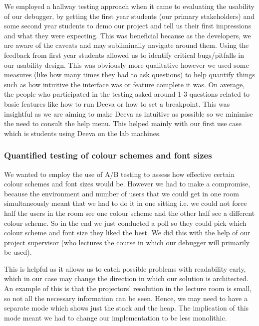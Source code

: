 \documentclass[11pt, a4paper]{article}
\begin{document}
We employed a hallway testing approach when it came to evaluating the usability of our debugger, by getting the first year students (our primary stakeholders) and some second year students to demo our project and tell us their first impressions and what they were expecting. This was beneficial because as the developers, we are aware of the caveats and may subliminally navigate around them.
Using the feedback from first year students allowed us to identify critical bugs/pitfalls in our usability design.
This was obviously more qualitative however we used some measures (like how many times they had to ask questions) to help quantify things such as how intuitive the interface was or feature complete it was.
On average, the people who participated in the testing asked around 1-3 questions related to basic features like how to run Deeva or how to set a breakpoint.
This was insightful as we are aiming to make Deeva as intuitive as possible so we minimise the need to consult the help menu.
This helped mainly with our first use case which is students using Deeva on the lab machines.

\subsubsection{Quantified testing of colour schemes and font sizes}
We wanted to employ the use of A/B testing to assess how effective certain colour schemes and font sizes would be.
However we had to make a compromise, because the environment and number of users that we could get in one room simultaneously meant that we had to do it in one sitting i.e. we could not force half the users in the room see one colour scheme and the other half see a different colour scheme.
So in the end we just conducted a poll so they could pick which colour scheme and font size they liked the best.
We did this with the help of our project supervisor (who lectures the course in which our debugger will primarily be used). 

This is helpful as it allows us to catch possible problems with readability early, which in our case may change the direction in which our solution is architected.
An example of this is that the projectors’ resolution in the lecture room is small, so not all the necessary information can be seen.
Hence, we may need to have a separate mode which shows just the stack and the heap.
The implication of this mode meant we had to change our implementation to be less monolithic.
\end{document}
